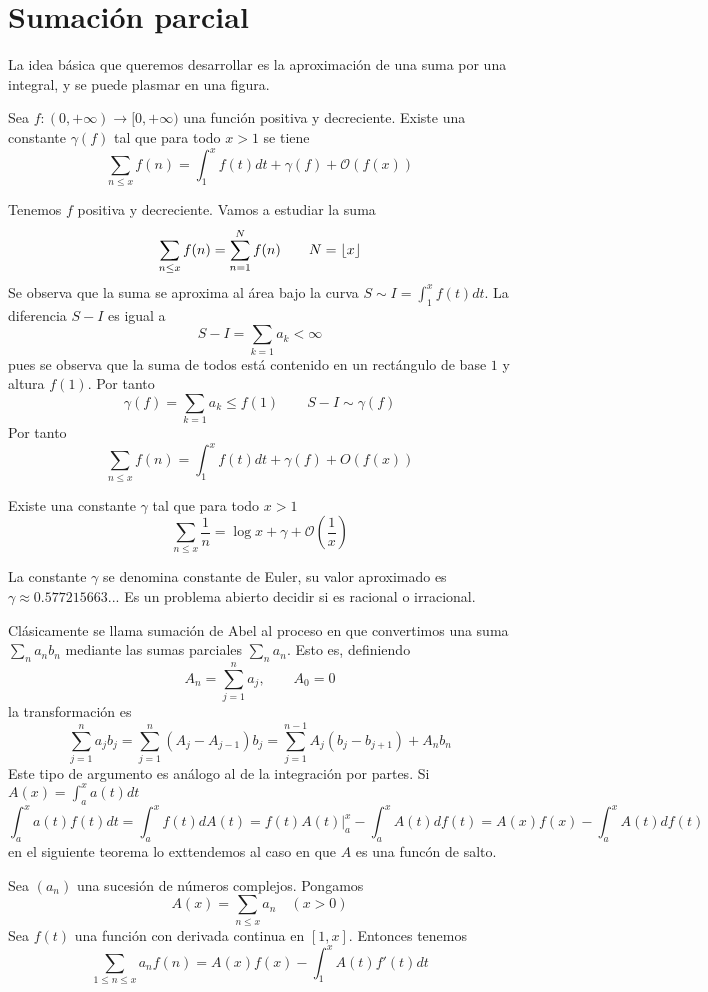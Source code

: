 \documentclass[TAN.tex]{subfiles}
\begin{document}
\section{Sumación parcial}
La idea básica que queremos desarrollar es la aproximación de una suma por una integral, y se puede plasmar en una figura.

\begin{teorema}
Sea $f : (0,+\infty) \to [0,+\infty)$ una función positiva y decreciente. Existe una constante $γ(f)$ tal que para todo $x>1$ se tiene
\[ \sum_{n≤x} f(n) = \int_1^x f(t)dt + γ(f) + \mathcal{O}(f(x)) \]
\end{teorema}
\begin{dem}
Tenemos $f$ positiva y decreciente. Vamos a estudiar la suma
$$
\sum_{n\leq x}f(n) = \sum_{n=1}^N f(n) \qquad N=\left\lfloor{x}\right\rfloor
$$
Se observa que la suma se aproxima al área bajo la curva $S\sim I = \int_1^x f(t)dt$. La diferencia $S-I$ es igual a 
$$S-I = \sum_{k=1} a_k < \infty$$ pues se observa que la suma de todos está contenido en un rectángulo de base $1$ y altura $f(1)$. Por tanto
$$
\gamma(f) = \sum_{k=1} a_k \leq f(1) \qquad S - I \sim \gamma(f) 
$$
Por tanto
$$
\sum_{n\leq x} f(n) = \int_1^x f(t)dt + \gamma(f) + O(f(x))
$$
\QED
\end{dem}

\begin{teorema}
Existe una constante $γ$ tal que para todo $x>1$
\[ \sum_{n≤x} \frac{1}{n} = \log x + γ + \mathcal{O}\left(\frac{1}{x}\right) \]
\end{teorema}
La constante $γ$ se denomina constante de Euler, su valor aproximado es $γ \approx 0.577215663...$ Es un problema abierto decidir si es racional o irracional.

Clásicamente se llama sumación de Abel al proceso en que convertimos una suma $\sum_n a_n b_n$ mediante las sumas parciales $\sum_n a_n$. Esto es, definiendo
\[ A_n = \sum_{j=1}^n a_j, \qquad A_0 = 0 \]
la transformación es
\[ \sum_{j=1}^n a_j b_j = \sum_{j=1}^n (A_j-A_{j-1})b_j = \sum_{j=1}^{n-1} A_j(b_j-b_{j+1}) + A_n b_n \]
Este tipo de argumento es análogo al de la integración por partes. Si $A(x)=\int_a^x a(t)dt$
\[ \int_a^x a(t)f(t) dt = \int_a^x f(t) dA(t) = \left.f(t)A(t)\right|_a^x - \int_a^x A(t) df(t) = A(x)f(x) - \int_a^x A(t) df(t) \]
en el siguiente teorema lo exttendemos al caso en que $A$ es una funcón de salto.

\begin{teorema} Sea $(a_n)$ una sucesión de números complejos. Pongamos
\[ A(x) = \sum_{n≤x} a_n \quad (x > 0) \]
Sea $f(t)$ una función con derivada continua en $[1,x]$. Entonces tenemos
\[ \sum_{1≤n≤x} a_nf(n) = A(x)f(x)-\int_1^x A(t)f'(t)dt \]
\end{teorema}
\newpage
\end{document}
